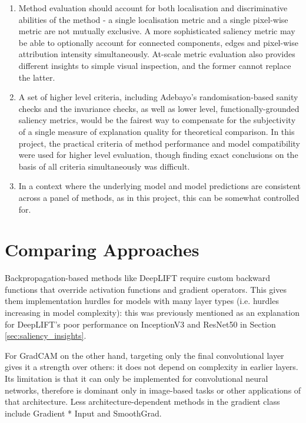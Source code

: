 \documentclass[main]{subfiles}
\begin{document}
\begin{enumerate}
\item Method evaluation should account for both localisation and discriminative abilities of the method - a single localisation metric and a single pixel-wise metric are not mutually exclusive. A more sophisticated saliency metric may be able to optionally account for connected components, edges and pixel-wise attribution intensity simultaneously. At-scale metric evaluation also provides different insights to simple visual inspection, and the former cannot replace the latter.
\item A set of higher level criteria, including Adebayo's randomisation-based sanity checks and the invariance checks, as well as lower level, functionally-grounded saliency metrics, would be the fairest way to compensate for the subjectivity of a single measure of explanation quality for theoretical comparison. In this project, the practical criteria of method performance and model compatibility were used for higher level evaluation, though finding exact conclusions on the basis of all criteria simultaneously was difficult.
\item In a context where the underlying model and model predictions are consistent across a panel of methods, as in this project, this can be somewhat controlled for.


\end{enumerate}



\section{Comparing Approaches}
Backpropagation-based methods like DeepLIFT require custom backward functions that override activation functions and gradient operators. This gives them implementation hurdles for models with many layer types (i.e. hurdles increasing in model complexity): this was previously mentioned as an explanation for DeepLIFT's poor performance on InceptionV3 and ResNet50 in Section \ref{sec:saliency_insights}.

For GradCAM on the other hand, targeting only the final convolutional layer gives it a strength over others: it does not depend on complexity in earlier layers. Its limitation is that it can only be implemented for convolutional neural networks, therefore is dominant only in image-based tasks or other applications of that architecture. Less architecture-dependent methods in the gradient class include Gradient * Input and SmoothGrad.
\end{document}
